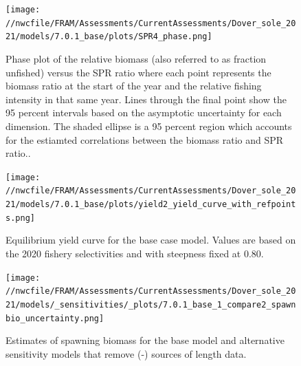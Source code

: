 \documentclass[11pt,
  english,
  a4paper,
]{article}
\begin{document}
\tagmcend\tagstructend


\begin{figure}
\centering
\texttt{[image: //nwcfile/FRAM/Assessments/CurrentAssessments/Dover\_sole\_2021/models/7.0.1\_base/plots/SPR4\_phase.png]}
\caption{Phase plot of the relative biomass (also referred to as fraction unfished) versus the SPR ratio where each point represents the biomass ratio at the start of the year and the relative fishing intensity in that same year. Lines through the final point show the 95 percent intervals based on the asymptotic uncertainty for each dimension. The shaded ellipse is a 95 percent region which accounts for the estiamted correlations between the biomass ratio and SPR ratio..\label{fig:phase}}
\end{figure}

\tagmcend\tagstructend


\begin{figure}
\centering
\texttt{[image: //nwcfile/FRAM/Assessments/CurrentAssessments/Dover\_sole\_2021/models/7.0.1\_base/plots/yield2\_yield\_curve\_with\_refpoints.png]}
\caption{Equilibrium yield curve for the base case model. Values are based on the 2020 fishery selectivities and with steepness fixed at 0.80.\label{fig:yield}}
\end{figure}

\tagmcend\tagstructend


\begin{figure}
\centering
\texttt{[image: //nwcfile/FRAM/Assessments/CurrentAssessments/Dover\_sole\_2021/models/\_sensitivities/\_plots/7.0.1\_base\_1\_compare2\_spawnbio\_uncertainty.png]}
\caption{Estimates of spawning biomass for the base model and alternative sensitivity models that remove (-) sources of length data.\label{fig:sens-length-ssb}}
\end{figure}
\end{document}
